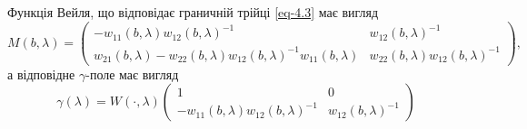 \begin{theorem}\label{th-4.2}
	Функція Вейля, що відповідає граничній трійці \eqref{eq-4.3} має вигляд
	\begin{equation}\label{eq-4.7}
		M(b,\lambda)=
		\begin{pmatrix}
			-w_{11}(b,\lambda)w_{12}(b,\lambda)^{-1} & w_{12}(b,\lambda)^{-1} \\
			w_{21}(b,\lambda) - w_{22}(b,\lambda)w_{12}(b,\lambda)^{-1}w_{11}(b,\lambda) & w_{22}(b,\lambda)w_{12}(b,\lambda)^{-1}
		\end{pmatrix},
	\end{equation}
	а відповідне $\gamma$-поле має вигляд
	\begin{equation}\label{eq-4.8}
		\gamma(\lambda) = W(\cdot,\lambda)
		\begin{pmatrix}
			1 & 0 \\
			-w_{11}(b,\lambda)w_{12}(b,\lambda)^{-1} & w_{12}(b,\lambda)^{-1}
		\end{pmatrix}
	\end{equation}
\end{theorem}
